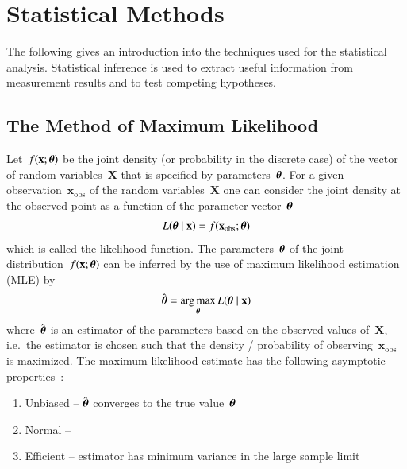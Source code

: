 \section{Statistical Methods}
\label{sec:statistical_methods}

The following gives an introduction into the techniques used for the
statistical analysis. Statistical inference is used to extract useful
information from measurement results and to test competing hypotheses.


\subsection{The Method of Maximum Likelihood}


Let~$f(\mathbf{x}; \boldsymbol{\theta})$ be the joint density (or
probability in the discrete case) of the vector of random
variables~$\mathbf{X}$ that is specified by
parameters~$\boldsymbol{\theta}$. For a given
observation~$\mathbf{x}_\text{obs}$ of the random variables~$\mathbf{X}$ one
can consider the joint density at the observed point as a function of
the parameter vector~$\boldsymbol{\theta}$
\begin{align*}
  L(\boldsymbol{\theta} \mid \mathbf{x}) = f(\mathbf{x}_\text{obs}; \boldsymbol{\theta})
\end{align*}
which is called the likelihood function. The parameters~$\boldsymbol{\theta}$
of the joint distribution~$f(\mathbf{x}; \boldsymbol{\theta})$ can be inferred
by the use of maximum likelihood estimation (MLE) by
\begin{align*}
  \hat{\boldsymbol{\theta}} = \operatorname*{arg\,max}_{\boldsymbol{\theta}} L(\boldsymbol{\theta} \mid \mathbf{x})
\end{align*}
where~$\hat{\boldsymbol{\theta}}$ is an estimator of the parameters based on
the observed values of~$\mathbf{X}$, i.e.\ the estimator is chosen
such that the density / probability of
observing~$\mathbf{x}_\text{obs}$ is maximized. The maximum likelihood
estimate has the following asymptotic properties~\cite{cramer1999}:
\begin{enumerate}
\item Unbiased -- $\hat{\boldsymbol{\theta}}$ converges to the true
  value~$\boldsymbol{\theta}$
\item Normal --
\item Efficient -- estimator has minimum variance in the large sample limit
\end{enumerate}

